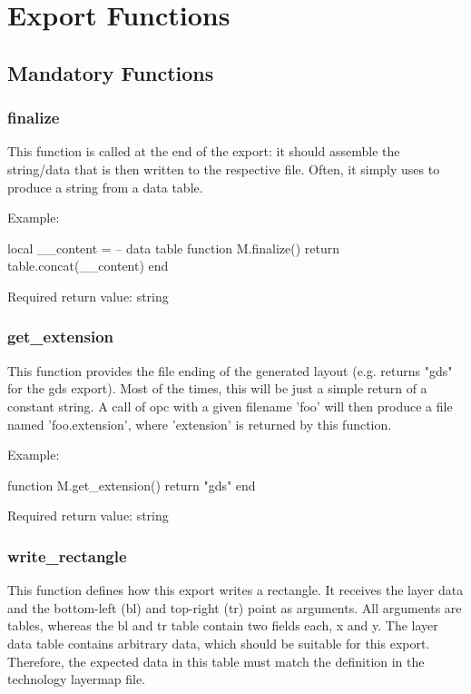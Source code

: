 \section{Export Functions}
\subsection{Mandatory Functions}
\subsubsection{finalize}
This function is called at the end of the export: it should assemble the string/data that is then written to the respective file.
Often, it simply uses  to produce a string from a data table.

Example:
\begin{lualisting}
    local __content = {} -- data table
    function M.finalize()
        return table.concat(__content)
    end
\end{lualisting}

Required return value: string

\subsubsection{get\_extension}
This function provides the file ending of the generated layout (e.g. returns "gds" for the gds export).
Most of the times, this will be just a simple return of a constant string.
A call of opc with a given filename 'foo' will then produce a file named 'foo.extension', where 'extension' is returned by this function.

Example:
\begin{lualisting}
    function M.get_extension()
        return "gds"
    end
\end{lualisting}

Required return value: string

\subsubsection{write\_rectangle}
This function defines how this export writes a rectangle.
It receives the layer data and the bottom-left (bl) and top-right (tr) point as arguments.
All arguments are tables, whereas the bl and tr table contain two fields each, x and y.
The layer data table contains arbitrary data, which should be suitable for this export.
Therefore, the expected data in this table must match the definition in the technology layermap file.

